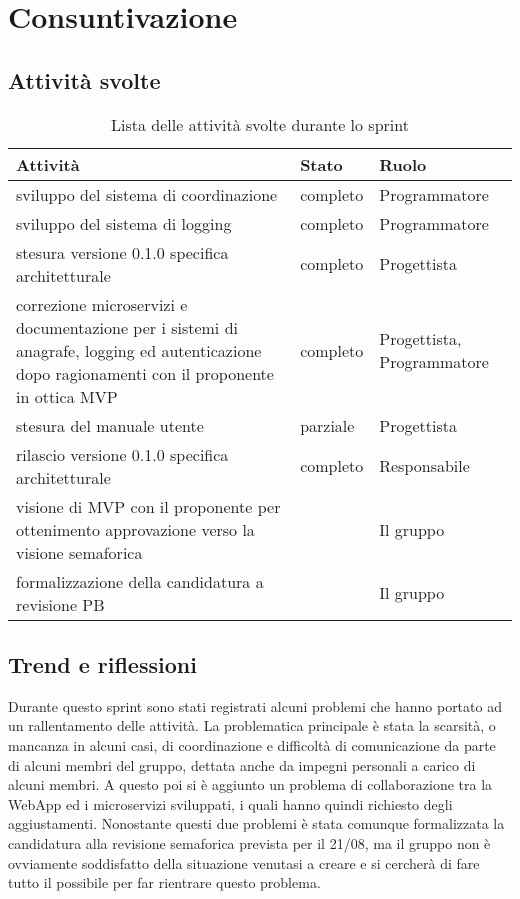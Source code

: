 \section{Consuntivazione}

\subsection{Attività svolte}

\begin{table}[H]
    \begin{xltabular}{\textwidth}{X l l}

         \textbf{Attività} & \textbf{Stato} & \textbf{Ruolo}\\
        \endhead
        \hline
        sviluppo del sistema di coordinazione & completo & Programmatore \\
        sviluppo del sistema di logging & completo & Programmatore \\
        stesura versione 0.1.0 specifica architetturale & completo & Progettista\\
        correzione microservizi e documentazione per i sistemi di anagrafe, logging ed autenticazione dopo ragionamenti con il proponente in ottica MVP & completo & Progettista, Programmatore \\
        stesura del manuale utente & parziale & Progettista \\
        rilascio versione 0.1.0 specifica architetturale & completo & Responsabile \\
        visione di MVP con il proponente per ottenimento approvazione verso la visione semaforica & & Il gruppo \\
        formalizzazione della candidatura a revisione PB & & Il gruppo \\
    \end{xltabular}
    \caption{Lista delle attività svolte durante lo sprint}
\end{table}

\subsection{Trend e riflessioni}\label{subsec:trend}

Durante questo sprint sono stati registrati alcuni problemi che hanno portato ad un rallentamento delle attività. La problematica principale è stata la scarsità, o mancanza in alcuni casi, di coordinazione e difficoltà di comunicazione da parte di alcuni membri del gruppo, dettata anche da impegni personali a carico di alcuni membri. A questo poi si è aggiunto un problema di collaborazione tra la WebApp ed i microservizi sviluppati, i quali hanno quindi richiesto degli aggiustamenti. Nonostante questi due problemi è stata comunque formalizzata la candidatura alla revisione semaforica prevista per il 21/08, ma il gruppo non è ovviamente soddisfatto della situazione venutasi a creare e si cercherà di fare tutto il possibile per far rientrare questo problema.

